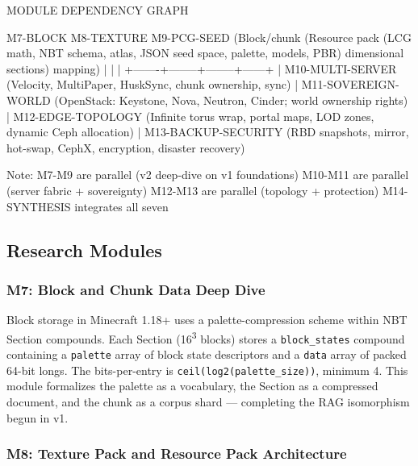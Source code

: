 \documentclass[11pt,letterpaper]{article}
\begin{document}
\begin{asciibox}
MODULE DEPENDENCY GRAPH

  M7-BLOCK       M8-TEXTURE      M9-PCG-SEED
  (Block/chunk   (Resource pack   (LCG math,
   NBT schema,    atlas, JSON      seed space,
   palette,       models, PBR)     dimensional
   sections)                       mapping)
      |               |                |
      +-------+--------+--------+------+
                       |
              M10-MULTI-SERVER
              (Velocity, MultiPaper,
               HuskSync, chunk
               ownership, sync)
                       |
              M11-SOVEREIGN-WORLD
              (OpenStack: Keystone,
               Nova, Neutron, Cinder;
               world ownership rights)
                       |
              M12-EDGE-TOPOLOGY
              (Infinite torus wrap,
               portal maps, LOD zones,
               dynamic Ceph allocation)
                       |
              M13-BACKUP-SECURITY
              (RBD snapshots, mirror,
               hot-swap, CephX, encryption,
               disaster recovery)

  Note: M7-M9 are parallel (v2 deep-dive on v1 foundations)
        M10-M11 are parallel (server fabric + sovereignty)
        M12-M13 are parallel (topology + protection)
        M14-SYNTHESIS integrates all seven
\end{asciibox}

\subsection{Research Modules}

\subsubsection{M7: Block and Chunk Data Deep Dive}

Block storage in Minecraft 1.18+ uses a palette-compression scheme within NBT Section compounds. Each Section (16\textsuperscript{3} blocks) stores a \texttt{block\_states} compound containing a \texttt{palette} array of block state descriptors and a \texttt{data} array of packed 64-bit longs. The bits-per-entry is \texttt{ceil(log2(palette\_size))}, minimum 4. This module formalizes the palette as a vocabulary, the Section as a compressed document, and the chunk as a corpus shard --- completing the RAG isomorphism begun in v1.

\subsubsection{M8: Texture Pack and Resource Pack Architecture}
\end{document}
